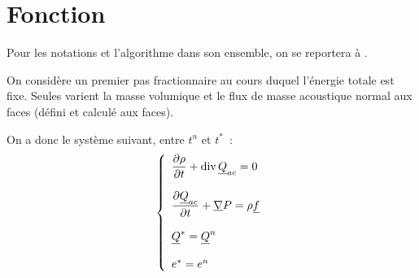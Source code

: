 
%
%
%
%


%
\vspace{1cm}
\section*{Fonction}

Pour les notations et l'algorithme dans son ensemble,
on se reportera à .

On considère un premier pas fractionnaire au cours duquel l'énergie totale
est fixe. Seules varient la masse volumique et le flux de masse acoustique
normal aux faces (défini et calculé aux faces).

On a donc le système suivant, entre $t^n$ et $t^*$~:
\begin{equation}\label{Cfbl_Cfmsvl_eq_acoustique_cfmsvl}
\left\{\begin{array}{l}

\displaystyle\frac{\partial\rho}{\partial t}+\text{div}\,{\underline{Q}_{ac}} = 0 \\
\\
\displaystyle\frac{\partial\underline{Q}_{ac}}{\partial t}+\underline{\nabla}{P} =
\rho \underline{f}\\
\\
\underline{Q}^*=\underline{Q}^n\\
\\
e^*=e^n\\

\end{array}\right.
\end{equation}

